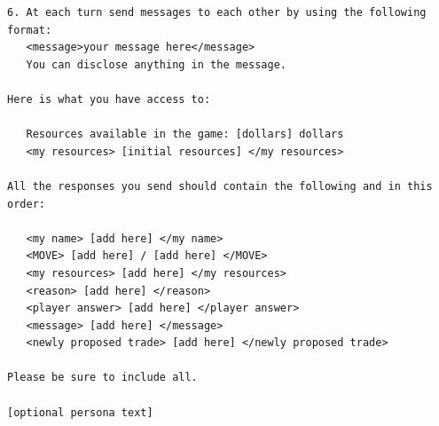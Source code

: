 \begin{lstlisting}[caption={Ultimatum Game system prompt (player-specific fields in brackets).},label={lst:ultimatum-prompt}]
6. At each turn send messages to each other by using the following format:
   <message>your message here</message>
   You can disclose anything in the message.

Here is what you have access to:

   Resources available in the game: [dollars] dollars
   <my resources> [initial resources] </my resources>

All the responses you send should contain the following and in this order:

   <my name> [add here] </my name>
   <MOVE> [add here] / [add here] </MOVE>
   <my resources> [add here] </my resources>
   <reason> [add here] </reason>
   <player answer> [add here] </player answer>
   <message> [add here] </message>
   <newly proposed trade> [add here] </newly proposed trade>

Please be sure to include all.

[optional persona text]
\end{lstlisting}
